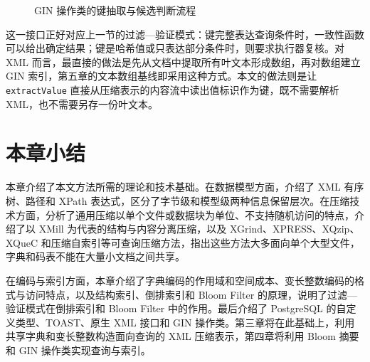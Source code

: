 \begin{figure}[htbp]
\centering
{}
\caption{GIN 操作类的键抽取与候选判断流程}
\label{fig:foundation-gin}
\end{figure}

这一接口正好对应上一节的过滤—验证模式：键完整表达查询条件时，一致性函数可以给出确定结果；键是哈希值或只表达部分条件时，则要求执行器复核。对 XML 而言，最直接的做法是先从文档中提取所有叶文本形成数组，再对数组建立 GIN 索引，第五章的文本数组基线即采用这种方式。本文的做法则是让 \texttt{extractValue} 直接从压缩表示的内容流中读出值标识作为键，既不需要解析 XML，也不需要另存一份叶文本。

\section{本章小结}

本章介绍了本文方法所需的理论和技术基础。在数据模型方面，介绍了 XML 有序树、路径和 XPath 表达式，区分了字节级和模型级两种信息保留层次。在压缩技术方面，分析了通用压缩以单个文件或数据块为单位、不支持随机访问的特点，介绍了以 XMill 为代表的结构与内容分离压缩，以及 XGrind、XPRESS、XQzip、XQueC 和压缩自索引等可查询压缩方法，指出这些方法大多面向单个大型文件，字典和码表不能在大量小文档之间共享。

在编码与索引方面，本章介绍了字典编码的作用域和空间成本、变长整数编码的格式与访问特点，以及结构索引、倒排索引和 Bloom Filter 的原理，说明了过滤—验证模式在倒排索引和 Bloom Filter 中的作用。最后介绍了 PostgreSQL 的自定义类型、TOAST、原生 XML 接口和 GIN 操作类。第三章将在此基础上，利用共享字典和变长整数构造面向查询的 XML 压缩表示，第四章将利用 Bloom 摘要和 GIN 操作类实现查询与索引。
